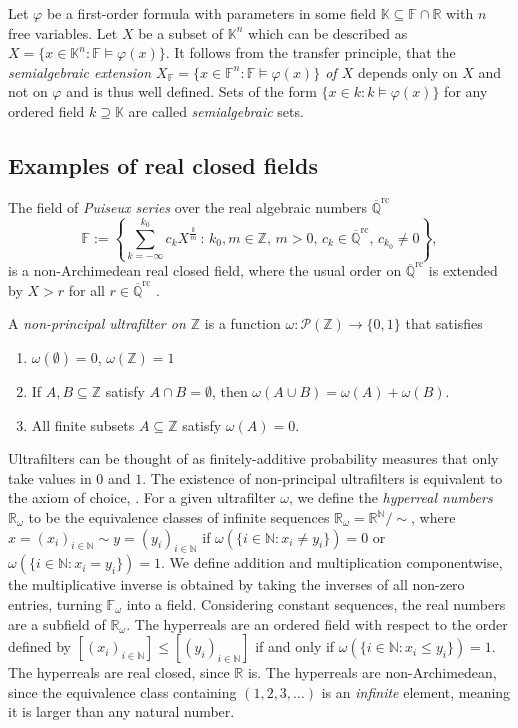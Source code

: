 \documentclass[12pt]{amsart}
\newcommand{\F}{\mathbb{F} }
\newcommand{\R}{\mathbb{R} }
\newcommand{\Q}{\mathbb{Q} }
\newcommand{\N}{\mathbb{N} }
\newcommand{\Z}{\mathbb{Z} }
\newcommand{\Qrc}{\overline{\Q}^{\operatorname{rc}}}
\newcommand{\K}{\mathbb{K}}
\numberwithin{equation}{section}
\theoremstyle{remark} %
\begin{document}
	Let $\varphi$ be a first-order formula with parameters in some field $\K \subseteq \F \cap \R$ with $n$ free variables. Let $X$ be a subset of $\K^n$ which can be described as $X = \{x \in \K^n \colon \F \models \varphi(x)\}$. It follows from the transfer principle, that the \emph{semialgebraic extension $X_\F = \{x \in \F^n \colon \F \models \varphi(x)\}$ of $X$} depends only on $X$ and not on $\varphi$ and is thus well defined. Sets of the form $\{x \in k \colon k \models \varphi(x)\}$ for any ordered field $k \supseteq \K$ are called \emph{semialgebraic} sets. 
	
	
	\subsection{Examples of real closed fields}\label{sec:real_closed_fields_examples}
	The field of \emph{Puiseux series} over the real algebraic numbers $\Qrc$
	$$
	\F  := \left\{  \sum_{k=-\infty}^{k_0} c_k X^{\frac{k}{m}} \, \colon \, k_0, m \in \mathbb{Z}, \, m > 0 , \, c_k \in \Qrc, \, c_{k_0}\neq 0\right\},
	$$ 
	is a non-Archimedean real closed field, where the usual order on $\Qrc$ is extended by $X>r$ for all $r \in \Qrc$ \cite{BCR}. 
	
	A \emph{non-principal ultrafilter on $\Z$} is a function $\omega \colon \mathcal{P}(\Z) \to \{0,1\}$ that satisfies
	\begin{enumerate}
		\item [(1)] $\omega(\emptyset) = 0$, $\omega(\Z) = 1$
		\item [(2)] If $A,B \subseteq \Z$ satisfy $A\cap B = \emptyset$, then $\omega(A \cup B) = \omega(A) + \omega(B)$.
		\item [(3)] All finite subsets $A \subseteq \Z$ satisfy $\omega(A) = 0$.
	\end{enumerate}
	Ultrafilters can be thought of as finitely-additive probability measures that only take values in $0$ and $1$. The existence of non-principal ultrafilters is equivalent to the axiom of choice, \cite{Hal}. For a given ultrafilter $\omega$, we define the \emph{hyperreal numbers} $\R_{\omega}$ to be the equivalence classes of infinite sequences $\R_{\omega} = \R^{\N}/ \!\! \sim$, where $x = (x_i)_{i \in \N} \sim y = (y_i)_{i \in \N}$ if $\omega(\{ i \in \N \colon x_i \neq y_i\}) = 0$ or $\omega(\{ i \in \N \colon x_i = y_i\}) = 1$. We define addition and multiplication componentwise, the multiplicative inverse is obtained by taking the inverses of all non-zero entries, turning $\F_\omega$ into a field. Considering constant sequences, the real numbers are a subfield of $\R_\omega$. The hyperreals are an ordered field with respect to the order defined by $[(x_i)_{i\in \N}] \leq [(y_i)_{i \in \N} ]$ if and only if $\omega(\{i \in \N \colon x_i \leq y_i\}) = 1$. The hyperreals are real closed, since $\R$ is. The hyperreals are non-Archimedean, since the equivalence class containing $(1, 2, 3, \ldots)$ is an \emph{infinite} element, meaning it is larger than any natural number. 
	
\end{document}
